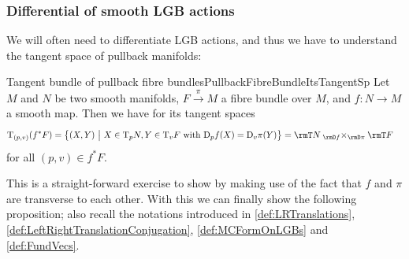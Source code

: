 \documentclass[reqno,a4paper,oneside]{amsart}
\newcommand\fibtimes[2]{\mathbin{_{#1}\times_{#2}}}
\theoremstyle{plain}
\theoremstyle{remark}
\theoremstyle{definition}
\def\bas#1\eas{\begin{align*}#1\end{align*}}
\begin{document}
\subsubsection{Differential of smooth LGB actions}

We will often need to differentiate LGB actions, and thus we have to understand the tangent space of pullback manifolds:

\begin{lemmata}{Tangent bundle of pullback fibre bundles}{PullbackFibreBundleItsTangentSp}
Let $M$ and $N$ be two smooth manifolds, $F \stackrel{\pi}{\to} M$ a fibre bundle over $M$, and $f\colon N \to M$ a smooth map. Then we have for its tangent spaces
\begin{align*}
\mathrm{T}_{(p, v)}\mleft( f^*F \mright)
&=
\bigl\{
	(X, Y)
	~\big|~
	X \in \mathrm{T}_pN, Y\in \mathrm{T}_vF \text{ with } \mathrm{D}_pf(X) = \mathrm{D}_v\pi(Y)
\bigr\}
=
\rmT N \fibtimes{\rmD f}{\rmD \pi} \rmT F
\end{align*}
for all $(p, v) \in f^*F$.
\end{lemmata}

This is a straight-forward exercise to show by making use of the fact that $f$ and $\pi$ are transverse to each other.
%
%
With this we can finally show the following proposition; also recall the notations introduced in \ref{def:LRTranslations}, \ref{def:LeftRightTranslationConjugation}, \ref{def:MCFormOnLGBs} and \ref{def:FundVecs}.
\end{document}
